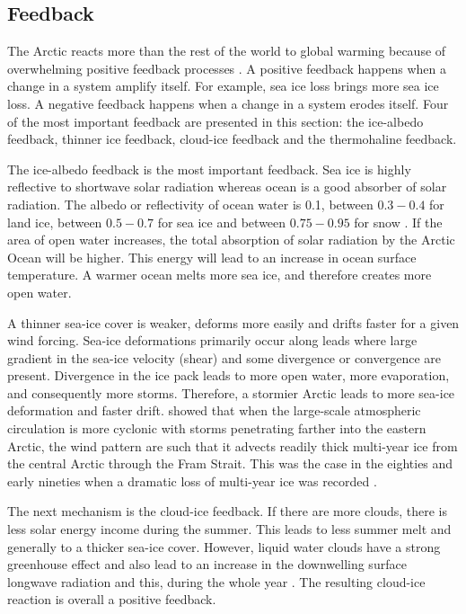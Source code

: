 
\subsection{Feedback}\label{feedback}

The Arctic reacts more than the rest of the world to global warming because of overwhelming positive feedback processes \citep{ACIA,HollandBitz2003}. A positive feedback happens when a change in a system amplify itself. For example, sea ice loss brings more sea ice loss. A negative feedback happens when a change in a system erodes itself. Four of the most important feedback are presented in this section: the ice-albedo feedback, thinner ice feedback, cloud-ice feedback and the thermohaline feedback. 

The ice-albedo feedback is the most important feedback. Sea ice is highly reflective to shortwave solar radiation whereas ocean is a good absorber of solar radiation. The albedo or reflectivity of ocean water is 0.1, between $0.3 - 0.4$ for land ice, between $0.5 - 0.7$ for sea ice and between $0.75 - 0.95$ for snow \citep{Ahrens:2009fk,Sknow:2013fk}.  If the area of open water increases,  the total absorption of solar radiation by the Arctic Ocean will be higher. This energy will lead to an increase in ocean surface temperature. A warmer ocean melts more sea ice, and therefore creates more open water. 

A thinner sea-ice cover is weaker, deforms more easily and drifts faster for a given wind forcing. Sea-ice deformations primarily occur along leads where large gradient in the sea-ice velocity (shear) and some divergence or convergence are present. Divergence in the ice pack leads to more open water, more evaporation, and consequently more storms. Therefore, a stormier Arctic leads to more sea-ice deformation and faster drift. \citet{Rigor:2002fk} showed that when the large-scale atmospheric circulation is more cyclonic with storms penetrating farther into the eastern Arctic, the wind pattern are such that it advects readily thick multi-year ice from the central Arctic through the Fram Strait. This was the case in the eighties and early nineties when a dramatic loss of multi-year ice was recorded \citep{Johannessen1999}. 

The next mechanism is the cloud-ice feedback. If there are more clouds, there is less solar energy income during the summer. This leads to less summer melt and generally to a thicker sea-ice cover. However, liquid water clouds have a strong greenhouse effect and also lead to an increase in the downwelling surface longwave radiation and this, during the whole year \citep{Shupe:2004fk,Gorodetskaya:2008kx}. The resulting cloud-ice reaction is overall a positive feedback.

